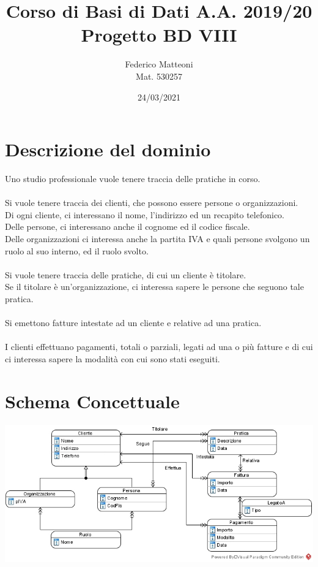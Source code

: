 \documentclass[10pt]{article}
\begin{document}
\renewcommand*\contentsname{Indice}
\title{Corso di Basi di Dati A.A. 2019/20\\Progetto BD VIII}
\author{Federico Matteoni\\Mat. 530257}
\date{24/03/2021}
\maketitle
\pagebreak
\section{Descrizione del dominio}
Uno studio professionale vuole tenere traccia delle pratiche in corso.\\\\
Si vuole tenere traccia dei clienti, che possono essere persone o organizzazioni.\\
Di ogni cliente, ci interessano il nome, l'indirizzo ed un recapito telefonico.\\
Delle persone, ci interessano anche il cognome ed il codice fiscale.\\ Delle organizzazioni ci interessa anche la partita IVA e quali persone svolgono un ruolo al suo interno, ed il ruolo svolto.\\\\
Si vuole tenere traccia delle pratiche, di cui un cliente è titolare.\\
Se il titolare è un'organizzazione, ci interessa sapere le persone che seguono tale pratica.\\\\
Si emettono fatture intestate ad un cliente e relative ad una pratica.\\\\
I clienti effettuano pagamenti, totali o parziali, legati ad una o più fatture e di cui ci interessa sapere la modalità con cui sono stati eseguiti.
\section{Schema Concettuale}
\begin{center}
	\includegraphics[scale=0.9]{Concettuale.jpg}
\end{center}
\end{document}

